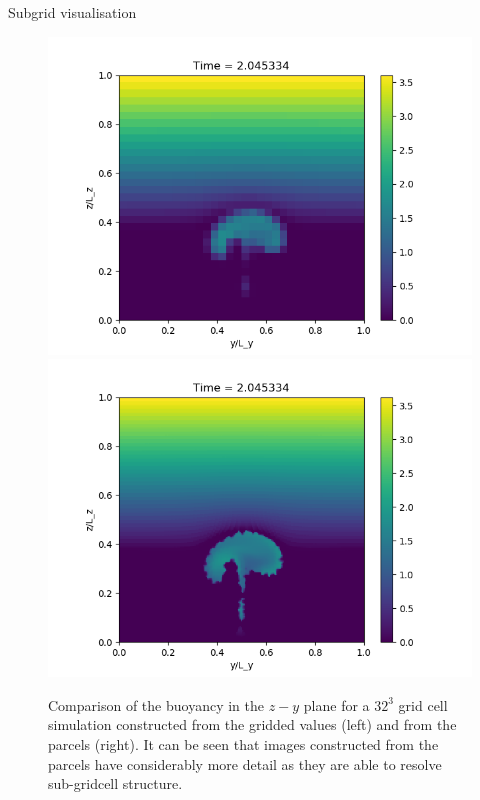 \documentclass{beamer}
\begin{document}
\begin{frame}{Subgrid visualisation}

\begin{figure}
  \begin{center}
    \includegraphics[scale=0.3]{pmpic_images/32grid.png}
    \includegraphics[scale=0.3]{pmpic_images/32parcels.png}
  \end{center}
  \caption{Comparison of the buoyancy in the $z-y$ plane for a $32^3$ grid cell simulation constructed from the gridded values (left) and from the parcels (right). It can be seen that images constructed from the parcels have considerably more detail as they are able to resolve sub-gridcell structure. \label{lowres}}
\end{figure}

\end{frame}
\end{document}
